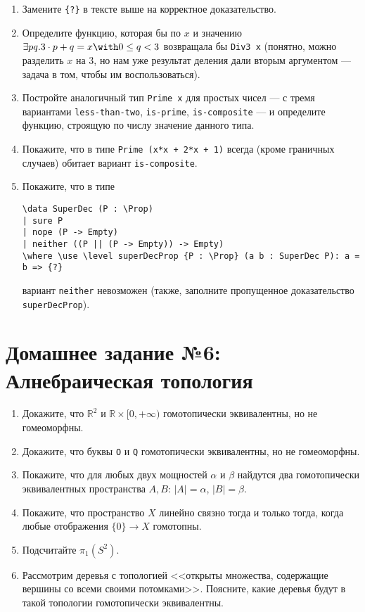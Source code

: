 \documentclass[10pt,a4paper,oneside]{article}
\begin{document}
\begin{enumerate}
\begin{enumerate}
\item Замените \verb!{?}! в тексте выше на корректное доказательство.
\item Определите функцию, которая бы по $x$ и значению $\exists p q.3 \cdot p + q = x \with 0 \le q < 3$ возвращала бы \verb!Div3 x!
(понятно, можно разделить $x$ на 3, но нам уже результат деления дали вторым аргументом --- задача в том, чтобы им воспользоваться).
\item Постройте аналогичный тип \verb!Prime x! для простых чисел --- с тремя вариантами \verb!less-than-two!, \verb!is-prime!, 
\verb!is-composite! --- и определите функцию, строящую по числу значение данного типа.
\item Покажите, что в типе \verb!Prime (x*x + 2*x + 1)! всегда (кроме граничных случаев) обитает вариант \verb!is-composite!.
\item Покажите, что в типе 
\begin{verbatim}
\data SuperDec (P : \Prop)
| sure P
| nope (P -> Empty)
| neither ((P || (P -> Empty)) -> Empty)
\where \use \level superDecProp {P : \Prop} (a b : SuperDec P): a = b => {?}
\end{verbatim}
вариант \verb!neither! невозможен (также, заполните пропущенное доказательство \verb!superDecProp!).
\end{enumerate}
\end{enumerate}


\section*{Домашнее задание №6: Алнебраическая топология}

\begin{enumerate}
\item Докажите, что $\mathbb{R}^2$ и $\mathbb{R}\times [0,+\infty)$ гомотопически эквивалентны, но не гомеоморфны.
\item Докажите, что буквы \verb!O! и \verb!Q! гомотопически эквивалентны, но не гомеоморфны.
\item Покажите, что для любых двух мощностей $\alpha$ и $\beta$ найдутся два гомотопически эквивалентных пространства $A, B$: $|A|=\alpha$,
$|B|=\beta$.
\item Покажите, что пространство $X$ линейно связно тогда и только тогда, когда любые отображения $\{0\} \rightarrow X$ гомотопны.
\item Подсчитайте $\pi_1(S^2)$.
\item Рассмотрим деревья с топологией <<открыты множества, содержащие вершины со всеми своими потомками>>. Поясните, какие деревья
будут в такой топологии гомотопически эквивалентны.
\end{enumerate}
\end{document}
